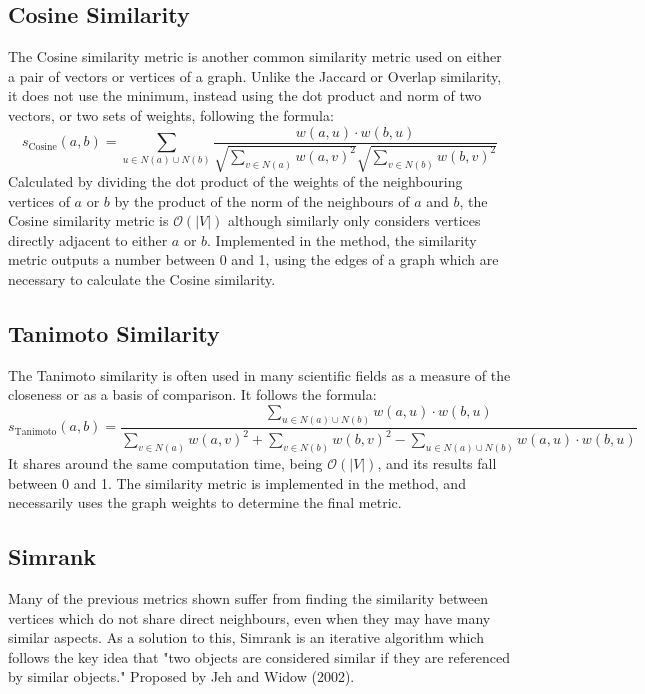 \documentclass[fontsize=11pt]{article}
\begin{document}
\subsection{Cosine Similarity}
The Cosine similarity metric is another common similarity metric used on either a pair of vectors or vertices of a graph. Unlike the Jaccard or Overlap similarity, it does not use the minimum, instead using the dot product and norm of two vectors, or two sets of weights, following the formula:
\[
s_{\text{Cosine}}(a, b) = \sum_{u \in N(a) \cup N(b)} \frac{w(a, u) \cdot w(b, u)}{\sqrt{\sum_{v \in N(a)}w(a, v)^2}\sqrt{\sum_{v \in N(b)}w(b, v)^2}}
\]
Calculated by dividing the dot product of the weights of the neighbouring vertices of $a$ or $b$ by the product of the norm of the neighbours of $a$ and $b$, the Cosine similarity metric is $\mathcal{O}(\lvert V \rvert)$ although similarly only considers vertices directly adjacent to either $a$ or $b$. Implemented in the  method, the similarity metric outputs a number between 0 and 1, using the edges of a graph which are necessary to calculate the Cosine similarity. 

\subsection{Tanimoto Similarity}
The Tanimoto similarity is often used in many scientific fields as a measure of the closeness or as a basis of comparison. It follows the formula:
\[
s_{\text{Tanimoto}}(a, b) = \frac{\sum_{u \in N(a) \cup N(b)} w(a, u) \cdot w(b, u)}{\sum_{v \in N(a)}w(a, v)^2 + \sum_{v \in N(b)}w(b, v)^2 - \sum_{u \in N(a) \cup N(b)} w(a, u) \cdot w(b, u)}
\]
It shares around the same computation time, being $\mathcal{O}(\lvert V \rvert)$, and its results fall between 0 and 1. The similarity metric is implemented in the  method, and necessarily uses the graph weights to determine the final metric. 

\subsection{Simrank}
Many of the previous metrics shown suffer from finding the similarity between vertices which do not share direct neighbours, even when they may have many similar aspects. As a solution to this, Simrank is an iterative algorithm which follows the key idea that "two objects are considered similar if they are referenced by similar objects." Proposed by Jeh and Widow (2002). 
\end{document}
